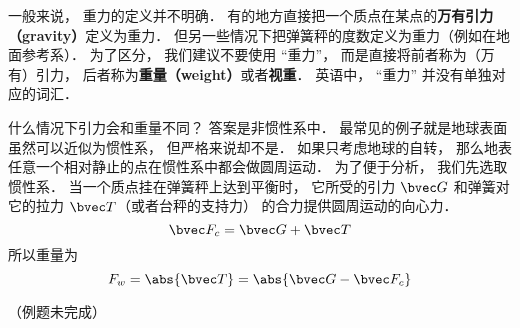 

一般来说， 重力的定义并不明确． 有的地方直接把一个质点在某点的\textbf{万有引力（gravity）}定义为重力． 但另一些情况下把弹簧秤的度数定义为重力（例如在地面参考系）． 为了区分， 我们建议不要使用 “重力”， 而是直接将前者称为（万有）引力， 后者称为\textbf{重量（weight）}或者\textbf{视重}． 英语中， “重力” 并没有单独对应的词汇．

什么情况下引力会和重量不同？ 答案是非惯性系中． 最常见的例子就是地球表面虽然可以近似为惯性系， 但严格来说却不是． 如果只考虑地球的自转， 那么地表任意一个相对静止的点在惯性系中都会做圆周运动． 为了便于分析， 我们先选取惯性系． 当一个质点挂在弹簧秤上达到平衡时， 它所受的引力 $\bvec G$ 和弹簧对它的拉力 $\bvec T$（或者台秤的支持力） 的合力提供圆周运动的向心力．
\begin{equation}
\bvec F_c = \bvec G + \bvec T
\end{equation}
所以重量为
\begin{equation}
F_w = \abs{\bvec T} = \abs{\bvec G - \bvec F_c}
\end{equation}

（例题未完成）
